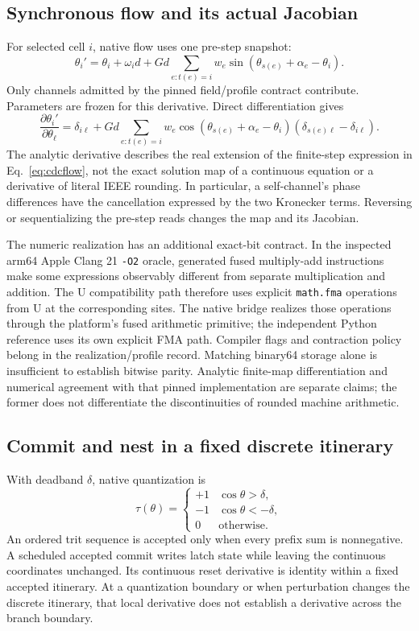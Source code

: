 \documentclass[11pt]{article}
\theoremstyle{remark}
\begin{document}
\subsection{Synchronous flow and its actual Jacobian}

For selected cell $i$, native flow uses one pre-step snapshot:
\begin{equation}
 \theta_i' = \theta_i + \omega_i d
 +Gd\sum_{e:t(e)=i}w_e
 \sin(\theta_{s(e)}+\alpha_e-\theta_i).
 \label{eq:cdcflow}
\end{equation}
Only channels admitted by the pinned field/profile contract contribute.
Parameters are frozen for this derivative. Direct differentiation gives
\begin{equation}
 \frac{\partial\theta_i'}{\partial\theta_\ell}
 =\delta_{i\ell}+Gd\sum_{e:t(e)=i}w_e
 \cos(\theta_{s(e)}+\alpha_e-\theta_i)
 (\delta_{s(e)\ell}-\delta_{i\ell}).
 \label{eq:cdcjac}
\end{equation}
The analytic derivative describes the real extension of the finite-step
expression in Eq.~\eqref{eq:cdcflow}, not the exact solution map of a
continuous equation or a derivative of literal IEEE rounding. In particular, a
self-channel's phase differences have the cancellation expressed by the
two Kronecker terms. Reversing or sequentializing the pre-step reads
changes the map and its Jacobian.

The numeric realization has an additional exact-bit contract. In the
inspected arm64 Apple Clang 21 \texttt{-O2} oracle, generated fused
multiply-add instructions make some expressions observably different from
separate multiplication and addition. The U compatibility path therefore
uses explicit \texttt{math.fma} operations from U at the corresponding
sites. The native bridge realizes those operations through the platform's
fused arithmetic primitive; the independent Python reference uses its own
explicit FMA path. Compiler flags and contraction policy belong in the
realization/profile record. Matching binary64 storage alone is insufficient
to establish bitwise parity. Analytic finite-map differentiation and
numerical agreement with that pinned implementation are separate claims;
the former does not differentiate the discontinuities of rounded machine
arithmetic.

\subsection{Commit and nest in a fixed discrete itinerary}

With deadband $\delta$, native quantization is
\[
 \tau(\theta)=\begin{cases}
 +1&\cos\theta>\delta,\\
 -1&\cos\theta<-\delta,\\
 0&\text{otherwise}.
 \end{cases}
\]
An ordered trit sequence is accepted only when every prefix sum is
nonnegative. A scheduled accepted commit writes latch state while leaving
the continuous coordinates unchanged. Its continuous reset derivative is
identity within a fixed accepted itinerary. At a quantization boundary or
when perturbation changes the discrete itinerary, that local derivative
does not establish a derivative across the branch boundary.
\end{document}
